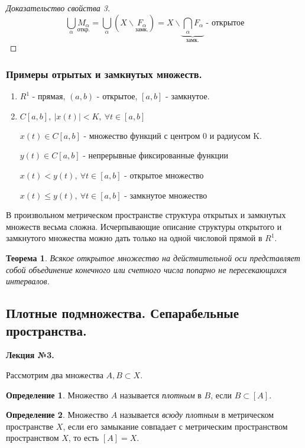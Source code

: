 \documentclass[14pt,a4paper]{extarticle}
\newtheorem{theorem}{Теорема}[section]
\theoremstyle{definition}
\newtheorem{definition}{Определение}[section]
\theoremstyle{remark}
\renewcommand{\[}{\begin{dmath*}[compact]}
\renewcommand{\]}{\end{dmath*}}
\newcommand{\be}{\begin{enumerate}}
\newcommand{\ee}{\end{enumerate}}
\newcommand{\sep}{ , \ \allowbreak }
\begin{document}
\begin{proof}[Доказательство свойства 3]
  \[ \bigcup _\alpha \underset{\text{откр.}}{M_\alpha} =
  \bigcup _\alpha\left(X\backslash\underset{\text{замк.}}{F_\alpha} \right) =
  X\backslash \underbrace{\bigcap _\alpha F_\alpha}_{\text{замк.}}
  \text{ - открытое} \]
\end{proof}

\subsubsection{Примеры отрытых и замкнутых множеств.}
\be
  \item $R^1$ - прямая, $(a, b)$ - открытое, $[a, b]$ - замкнутое.

  \item $C[a, b]\sep |x(t)| < K \sep \forall t \in [a, b]$

  $x(t) \in C[a, b]$ - множество функций с центром 0 и радиусом K.

  $y(t) \in C[a, b]$ - непрерывные фиксированные функции

  $x(t) < y(t) \sep \forall t \in [a, b]$ - открытое множество

  $x(t) \leq y(t) \sep \forall t \in [a, b]$ - замкнутое множество
\ee

В произвольном метрическом пространстве структура открытых и замкнутых
множеств весьма сложна.
Исчерпывающие описание структуры открытого и замкнутого множества можно дать
только на одной числовой прямой в $R^1$.

\begin{theorem}
  Всякое открытое множество на действительной оси представляет собой
  объединение конечного или счетного числа попарно не пересекающихся интервалов.
\end{theorem}

\subsection{Плотные подмножества. Сепарабельные пространства.}

\textbf{Лекция №3.}

Рассмотрим два множества $A, B\subset X$.

\begin{definition}
  Множество $A$ называется \textit{плотным} в $B$, если $B \subset [A]$.
\end{definition}

\begin{definition}
  Множество $A$ называется \textit{всюду плотным} в метрическом
  пространстве $X$, если его замыкание совпадает с метрическим пространством
  пространством $X$, то есть $[A]=X$.
\end{definition}
\end{document}
